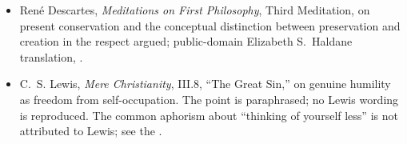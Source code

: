 {\fontsize{8.6}{9.6}\selectfont
\begin{itemize}[itemsep=0pt,parsep=0pt,topsep=0.05em]
\item Ren\'e Descartes, \emph{Meditations on First Philosophy}, Third Meditation, on present conservation and the conceptual distinction between preservation and creation in the respect argued; public-domain Elizabeth S.~Haldane translation, .
\item C.~S. Lewis, \emph{Mere Christianity}, III.8, ``The Great Sin,'' on genuine humility as freedom from self-occupation. The point is paraphrased; no Lewis wording is reproduced. The common aphorism about ``thinking of yourself less'' is not attributed to Lewis; see the .
\end{itemize}}

\endgroup
